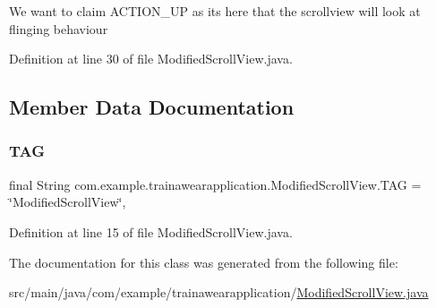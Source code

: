 We want to claim A\+C\+T\+I\+O\+N\+\_\+\+UP as it\textquotesingle{}s here that the scrollview will look at flinging behaviour 

Definition at line 30 of file Modified\+Scroll\+View.\+java.


\begin{DoxyCode}{0}

\end{DoxyCode}


\subsection{Member Data Documentation}
\mbox{\label{classcom_1_1example_1_1trainawearapplication_1_1_modified_scroll_view_aa8c3ba8f3bb238ac0f2d56e82757814a}} 
\subsubsection{\texorpdfstring{TAG}{TAG}}
{\footnotesize\ttfamily final String com.\+example.\+trainawearapplication.\+Modified\+Scroll\+View.\+T\+AG = \char`\"{}Modified\+Scroll\+View\char`\"{}\hspace{0.3cm}{\ttfamily [static]}, {\ttfamily [private]}}



Definition at line 15 of file Modified\+Scroll\+View.\+java.



The documentation for this class was generated from the following file\+:\begin{DoxyCompactItemize}
\item 
src/main/java/com/example/trainawearapplication/\mbox{\hyperlink{_modified_scroll_view_8java}{Modified\+Scroll\+View.\+java}}\end{DoxyCompactItemize}
